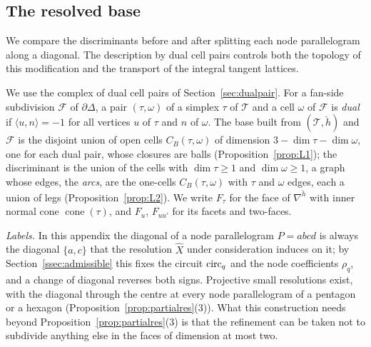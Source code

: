 \subsection{The resolved base}\label{ssec:res-base}
We compare the discriminants before and after splitting each node parallelogram along a diagonal.
The description by dual cell pairs controls both the topology of this modification and the transport of the integral tangent lattices.

We use the complex of dual cell pairs of Section~\ref{sec:dualpair}. For a fan-side subdivision $\mathcal F$ of $\partial\Delta$, a
pair $(\tau,\omega)$ of a simplex $\tau$ of $\mathcal T$ and a cell $\omega$ of $\mathcal F$ is \emph{dual} if
$\langle u,n\rangle=-1$ for all vertices $u$ of $\tau$ and $n$ of $\omega$. The base built from $(\mathcal T,\check h)$ and
$\mathcal F$ is the disjoint union of open cells $C_B(\tau,\omega)$ of dimension $3-\dim\tau-\dim\omega$, one for each dual
pair, whose closures are balls (Proposition~\ref{prop:L1}); the discriminant is the union of the cells with $\dim\tau\ge1$
and $\dim\omega\ge1$, a graph whose edges, the \emph{arcs}, are the one-cells $C_B(\tau,\omega)$ with $\tau$ and $\omega$
edges, each a union of legs (Proposition~\ref{prop:L2}). We write $F_\tau$ for the face of $\nabla^{\check h}$ with inner
normal cone $\operatorname{cone}(\tau)$, and $F_u$, $F_{uu'}$ for its facets and two-faces.

\emph{Labels.} In this appendix the diagonal of a node parallelogram $P=abcd$ is always the diagonal $\{a,c\}$ that the
resolution $\widehat X$ under consideration induces on it; by Section~\ref{ssec:admissible} this fixes the circuit
$\mathrm{circ}_q$ and the node coefficients $\rho_q$, and a change of diagonal reverses both signs. Projective small resolutions
exist, with the diagonal through the centre at every node parallelogram of a pentagon or a hexagon
(Proposition~\ref{prop:partialres}(3)). What this construction needs beyond Proposition~\ref{prop:partialres}(3) is that the
refinement can be taken not to subdivide anything else in the faces of dimension at most two.


